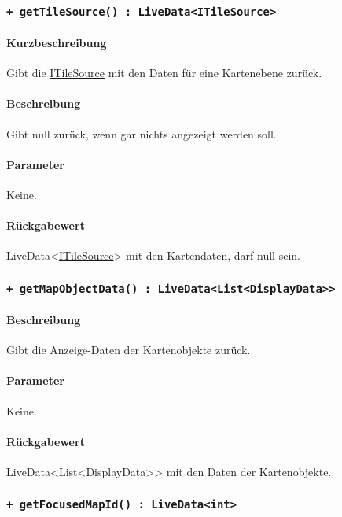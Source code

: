 \subsubsection*{\texttt{+ getTileSource() : LiveData<\href{https://osmdroid.github.io/osmdroid/javadocAll/org/osmdroid/tileprovider/tilesource/ITileSource.html}{ITileSource}>}}%
\paragraph*{Kurzbeschreibung}
Gibt die \href{https://osmdroid.github.io/osmdroid/javadocAll/org/osmdroid/tileprovider/tilesource/ITileSource.html}
{ITileSource} mit den Daten für eine Kartenebene zurück.
\paragraph*{Beschreibung}
Gibt null zurück, wenn gar nichts angezeigt werden soll.
\paragraph*{Parameter}
Keine.
\paragraph*{Rückgabewert}
LiveData<\href{https://osmdroid.github.io/osmdroid/javadocAll/org/osmdroid/tileprovider/tilesource/ITileSource.html}
{ITileSource}> mit den Kartendaten, darf null sein.

\subsubsection*{\texttt{+ getMapObjectData() : LiveData<List<DisplayData>>}}%
\paragraph*{Beschreibung}
Gibt die Anzeige-Daten der Kartenobjekte zurück.
\paragraph*{Parameter}
Keine.
\paragraph*{Rückgabewert}
LiveData<List<DisplayData>> mit den Daten der Kartenobjekte.

\subsubsection*{\texttt{+ getFocusedMapId() : LiveData<int>}}%

